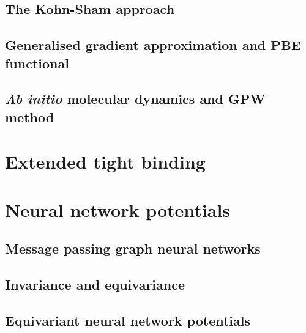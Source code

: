 \subsection{The Kohn-Sham approach}

\subsection{Generalised gradient approximation and PBE functional}

\subsection{\textit{Ab initio} molecular dynamics and GPW method}



\section{Extended tight binding}



\section{Neural network potentials}

\subsection{Message passing graph neural networks}

\subsection{Invariance and equivariance}

\subsection{Equivariant neural network potentials}